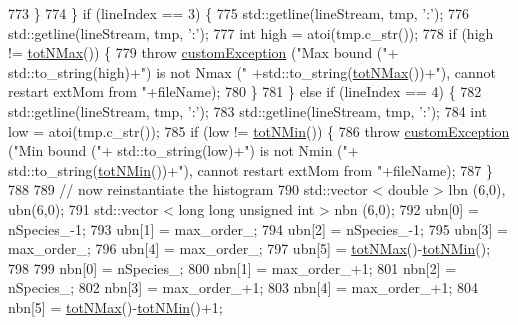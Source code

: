 \begin{DoxyCode}
773             \}
774         \} \textcolor{keywordflow}{if} (lineIndex == 3) \{
775             std::getline(lineStream, tmp, \textcolor{charliteral}{':'});
776             std::getline(lineStream, tmp, \textcolor{charliteral}{':'});
777             \textcolor{keywordtype}{int} high = atoi(tmp.c\_str());
778             \textcolor{keywordflow}{if} (high != \hyperlink{classsim_system_aee2c65ecb43a35c0c4d070cdb45f7dc0}{totNMax}()) \{
779                 \textcolor{keywordflow}{throw} \hyperlink{classcustom_exception}{customException} (\textcolor{stringliteral}{"Max bound ("}+ std::to\_string(high)+\textcolor{stringliteral}{") is not Nmax ("}
      +std::to\_string(\hyperlink{classsim_system_aee2c65ecb43a35c0c4d070cdb45f7dc0}{totNMax}())+\textcolor{stringliteral}{"), cannot restart extMom from "}+fileName);
780             \}
781         \} \textcolor{keywordflow}{else} \textcolor{keywordflow}{if} (lineIndex == 4) \{
782             std::getline(lineStream, tmp, \textcolor{charliteral}{':'});
783             std::getline(lineStream, tmp, \textcolor{charliteral}{':'});
784             \textcolor{keywordtype}{int} low = atoi(tmp.c\_str());
785             \textcolor{keywordflow}{if} (low != \hyperlink{classsim_system_af10842e0eaa638373b8717c87b47e6bc}{totNMin}()) \{
786                 \textcolor{keywordflow}{throw} \hyperlink{classcustom_exception}{customException} (\textcolor{stringliteral}{"Min bound ("}+ std::to\_string(low)+\textcolor{stringliteral}{") is not Nmin ("}+
      std::to\_string(\hyperlink{classsim_system_af10842e0eaa638373b8717c87b47e6bc}{totNMin}())+\textcolor{stringliteral}{"), cannot restart extMom from "}+fileName);
787             \}
788 
789             \textcolor{comment}{// now reinstantiate the histogram}
790             std::vector < double > lbn (6,0), ubn(6,0);
791             std::vector < long long unsigned int > nbn (6,0);
792             ubn[0] = nSpecies\_-1;
793             ubn[1] = max\_order\_;
794             ubn[2] = nSpecies\_-1;
795             ubn[3] = max\_order\_;
796             ubn[4] = max\_order\_;
797             ubn[5] = \hyperlink{classsim_system_aee2c65ecb43a35c0c4d070cdb45f7dc0}{totNMax}()-\hyperlink{classsim_system_af10842e0eaa638373b8717c87b47e6bc}{totNMin}();
798 
799             nbn[0] = nSpecies\_;
800             nbn[1] = max\_order\_+1;
801             nbn[2] = nSpecies\_;
802             nbn[3] = max\_order\_+1;
803             nbn[4] = max\_order\_+1;
804             nbn[5] = \hyperlink{classsim_system_aee2c65ecb43a35c0c4d070cdb45f7dc0}{totNMax}()-\hyperlink{classsim_system_af10842e0eaa638373b8717c87b47e6bc}{totNMin}()+1;

\end{DoxyCode}
